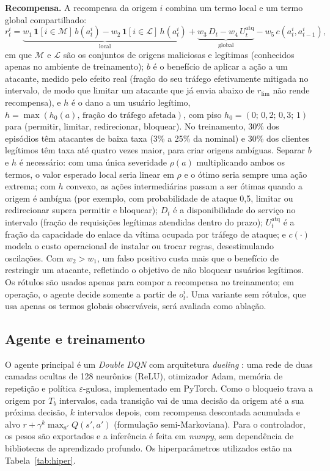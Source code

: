 \documentclass[12pt]{article}
\begin{document}
\textbf{Recompensa.} A recompensa da origem $i$ combina um termo local e um
termo global compartilhado:
\begin{equation}
  r_t^i = \underbrace{w_1\,\mathbf{1}[i \in \mathcal{M}]\,b(a_t^i)
          - w_2\,\mathbf{1}[i \in \mathcal{L}]\,h(a_t^i)}_{\text{local}}
          + \underbrace{w_3\,D_t - w_4\,U^{\mathrm{atq}}_t}_{\text{global}}
          - w_5\,c(a_t^i,a_{t-1}^i),
  \label{eq:recompensa}
\end{equation}
em que $\mathcal{M}$ e $\mathcal{L}$ são os conjuntos de origens maliciosas e
legítimas (conhecidos apenas no ambiente de treinamento); $b$ é o benefício de
aplicar a ação a um atacante, medido pelo efeito real (fração do seu tráfego
efetivamente mitigada no intervalo, de modo que limitar um atacante que já
envia abaixo de $r_{\mathrm{lim}}$ não rende recompensa), e $h$ é o dano a um
usuário legítimo, $h=\max(h_0(a),\,\text{fração do tráfego afetada})$, com piso
$h_0=(0;\,0{,}2;\,0{,}3;\,1)$ para (permitir, limitar, redirecionar, bloquear).
No treinamento, 30\% dos episódios têm atacantes de baixa taxa (3\% a 25\% da
nominal) e 30\% dos clientes legítimos têm taxa até quatro vezes maior, para
criar origens ambíguas.
Separar $b$ e $h$ é necessário: com uma única severidade $\rho(a)$ multiplicando
ambos os termos, o valor esperado local seria linear em $\rho$ e o ótimo seria
sempre uma ação extrema; com $h$ convexo, as ações intermediárias passam a ser
ótimas quando a origem é ambígua (por exemplo, com probabilidade de ataque
0{,}5, limitar ou redirecionar supera permitir e bloquear);
$D_t$ é a disponibilidade do serviço no intervalo (fração de requisições
legítimas atendidas dentro do prazo); $U^{\mathrm{atq}}_t$ é a fração da
capacidade do enlace da vítima ocupada por tráfego de ataque; e $c(\cdot)$
modela o custo operacional de instalar ou trocar regras, desestimulando
oscilações. Com $w_2 > w_1$, um falso positivo custa mais que o benefício de
restringir um atacante, refletindo o objetivo de não bloquear usuários
legítimos. Os rótulos são usados apenas para compor a recompensa no
treinamento; em operação, o agente decide somente a partir de $o_t^i$. Uma
variante sem rótulos, que usa apenas os termos globais observáveis, será
avaliada como ablação.

\subsection{Agente e treinamento}

O agente principal é um \textit{Double DQN} \cite{vanhasselt2016ddqn} com
arquitetura \textit{dueling} \cite{wang2016dueling}: uma rede de duas camadas
ocultas de 128 neurônios (ReLU), otimizador Adam, memória de repetição e
política $\varepsilon$-gulosa, implementado em PyTorch. Como o bloqueio trava
a origem por $T_b$ intervalos, cada transição vai de uma decisão da origem até
a sua próxima decisão, $k$ intervalos depois, com recompensa descontada
acumulada e alvo $r + \gamma^k \max_{a'} Q(s',a')$ (formulação
semi-Markoviana). Para o controlador, os pesos são exportados e a inferência é
feita em \textit{numpy}, sem dependência de bibliotecas de aprendizado
profundo. Os hiperparâmetros utilizados estão na Tabela~\ref{tab:hiper}.
\end{document}
